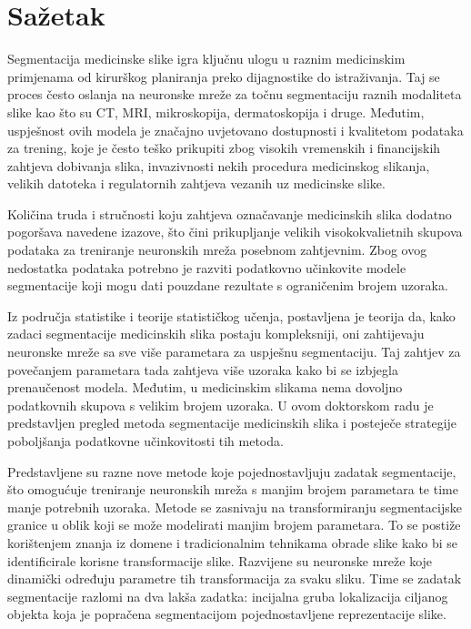 \chapter{Sažetak}

Segmentacija medicinske slike igra ključnu ulogu u raznim medicinskim primjenama od kirurškog planiranja preko dijagnostike do istraživanja. Taj se proces često oslanja na neuronske mreže za točnu segmentaciju raznih modaliteta slike kao što su CT, MRI, mikroskopija, dermatoskopija i druge. Međutim, uspješnost ovih modela je značajno uvjetovano dostupnosti i kvalitetom podataka za trening, koje je često teško prikupiti zbog visokih vremenskih i financijskih zahtjeva dobivanja slika, invazivnosti nekih procedura medicinskog slikanja, velikih datoteka i regulatornih zahtjeva vezanih uz medicinske slike.

Količina truda i stručnosti koju zahtjeva označavanje medicinskih slika  dodatno pogoršava navedene izazove, što čini prikupljanje velikih visokokvalietnih skupova podataka za treniranje neuronskih mreža posebnom zahtjevnim. Zbog ovog nedostatka podataka potrebno je razviti podatkovno učinkovite modele segmentacije koji mogu dati pouzdane rezultate s ograničenim brojem uzoraka.

Iz područja statistike i teorije statističkog učenja, postavljena je teorija da, kako zadaci segmentacije medicinskih slika postaju kompleksniji, oni zahtijevaju neuronske mreže sa sve više parametara za uspješnu segmentaciju. Taj zahtjev za povečanjem parametara tada zahtjeva više uzoraka kako bi se izbjegla prenaučenost modela. Međutim, u medicinskim slikama nema dovoljno podatkovnih skupova s velikim brojem uzoraka. U ovom doktorskom radu je predstavljen pregled metoda segmentacije medicinskih slika i posteječe strategije poboljšanja podatkovne učinkovitosti tih metoda.

Predstavljene su razne nove metode koje pojednostavljuju zadatak segmentacije, što omogućuje treniranje neuronskih mreža s manjim brojem parametara te time manje potrebnih uzoraka. Metode se zasnivaju na transformiranju segmentacijske granice u oblik koji se može modelirati manjim brojem parametara. To se postiže korištenjem znanja iz domene i tradicionalnim tehnikama obrade slike kako bi se identificirale korisne transformacije slike. Razvijene su neuronske mreže koje dinamički određuju parametre tih transformacija za svaku sliku. Time se zadatak segmentacije razlomi na dva lakša zadatka: incijalna gruba lokalizacija ciljanog objekta koja je popračena segmentacijom pojednostavljene reprezentacije slike.

